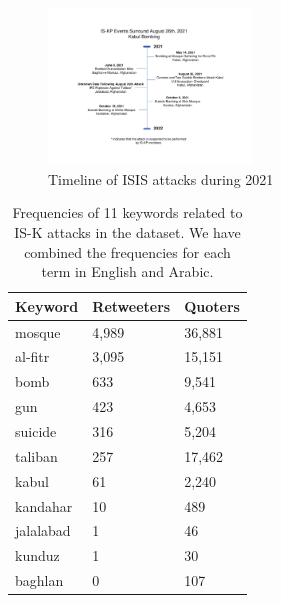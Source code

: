 \documentclass[letterpaper]{article} %
\begin{document}
\begin{figure}[ht]
\includegraphics[width=0.48\textwidth]{img/Timeline2021.pdf}
\caption{Timeline of ISIS attacks during 2021}
\label{fig:Timeline2021}
\end{figure}


\begin{table}[!htbp]
\centering
\begin{tabular}{|l||l|l|} 
 \hline
 Keyword & Retweeters & Quoters\\ [0.5ex] 
 \hline\hline
 mosque & 4,989 & 36,881\\\hline
 al-fitr & 3,095 & 15,151\\\hline
  bomb & 633 & 9,541\\\hline
  gun & 423 & 4,653\\\hline
  suicide & 316 & 5,204\\\hline
  taliban & 257 & 17,462\\\hline
  kabul & 61 & 2,240\\\hline
  kandahar & 10 & 489\\\hline
  jalalabad & 1 & 46\\\hline
  kunduz & 1 & 30\\\hline
  baghlan & 0 & 107\\[0.25ex]\hline
\end{tabular}
\caption{Frequencies of 11 keywords related to IS-K attacks in the dataset. We have combined the frequencies for each term in English and Arabic.}
\label{table:attacks}
\end{table}


 
\end{document}
